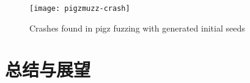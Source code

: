 \begin{figure}[ht]
    \centering
    \texttt{[image: pigzmuzz-crash]}
    \caption{\label{fig:pigzmuzz-crash}Crashes found in pigz fuzzing with generated initial seeds}
\end{figure}

\clearpage

\section{总结与展望}





